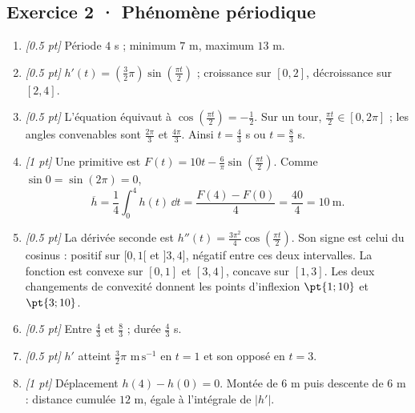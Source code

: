 \subsection*{Exercice 2 · Phénomène périodique}\begin{enumerate}

\item \textit{[\num{0,5} pt]} Période $4$ s ; minimum $7$ m, maximum $13$ m.

\item \textit{[\num{0,5} pt]} $h'(t)=(\frac{3}{2}\pi)\sin (\frac{\pi t}{2})$ ; croissance sur $[0,2]$, décroissance sur $[2,4]$.

\item \textit{[\num{0,5} pt]} L'équation équivaut à $\cos (\frac{\pi t}{2})=-\frac{1}{2}$. Sur un tour, $\frac{\pi t}{2}\in[0,2\pi]$ ; les angles convenables sont $\frac{2\pi}{3}$ et $\frac{4\pi}{3}$. Ainsi $t=\frac{4}{3}$ s ou $t=\frac{8}{3}$ s.

\item \textit{[1 pt]} Une primitive est $F(t)=10t-\frac{6}{\pi}\sin (\frac{\pi t}{2})$. Comme $\sin0=\sin(2\pi)=0$,
\[\overline h=\frac{1}{4}\int_0^{4}h(t)\,\dd t=\frac{F(4)-F(0)}{4}=\frac{40}{4}=10\ \mathrm{m}.\]

\item \textit{[\num{0,5} pt]} La dérivée seconde est $h''(t)=\frac{3\pi^2}{4}\cos (\frac{\pi t}{2})$. Son signe est celui du cosinus : positif sur $[0,1[$ et $]3,4]$, négatif entre ces deux intervalles. La fonction est convexe sur $[0,1]$ et $[3,4]$, concave sur $[1,3]$. Les deux changements de convexité donnent les points d'inflexion $\pt{1;10}$ et $\pt{3;10}$.

\item \textit{[\num{0,5} pt]} Entre $\frac{4}{3}$ et $\frac{8}{3}$ ; durée $\frac{4}{3}$ s.

\item \textit{[\num{0,5} pt]} $h'$ atteint $\frac{3}{2}\pi$ $\mathrm{m\,s^{-1}}$ en $t=1$ et son opposé en $t=3$.

\item \textit{[1 pt]} Déplacement $h(4)-h(0)=0$. Montée de $6$ m puis descente de $6$ m : distance cumulée $12$ m, égale à l'intégrale de $|h'|$.

\end{enumerate}

